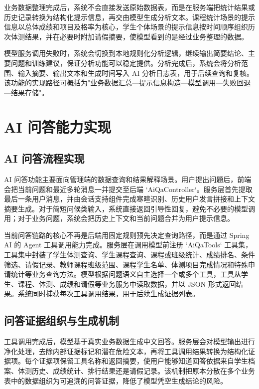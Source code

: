 业务数据整理完成后，系统不会直接发送原始数据表，而是在服务端把统计结果或历史记录转换为结构化提示信息，再交由模型生成分析文本。课程统计场景的提示信息以总体成绩和项目及格率为核心，学生个体场景的提示信息按时间顺序组织历次体测结果，并在必要时附加请假摘要，使模型看到的是经过业务整理的数据。

模型服务调用失败时，系统会切换到本地规则化分析逻辑，继续输出简要结论、主要问题和训练建议，保证分析功能可以稳定提供。分析完成后，系统会将分析范围、输入摘要、输出文本和生成时间写入 AI 分析日志表，用于后续查询和复核。该功能的实现路径可概括为"业务数据汇总—提示信息构造—模型调用—失败回退—结果存储"。

\section{AI 问答能力实现}

\subsection{AI 问答流程实现}

AI 问答功能主要面向管理端的数据查询和结果解释场景。用户提出问题后，前端会把当前问题和最近多轮消息一并提交至后端 `AiQaController`。服务层首先提取最后一条用户消息，并由会话支持组件完成寒暄识别、历史用户发言拼接和上下文摘要生成。对于简短问候类输入，系统直接返回引导性回复，避免不必要的模型调用；对于业务问题，系统会把历史上下文和当前问题合并为用户提示信息。

当前问答链路的核心不再是后端用固定规则预先决定查询路径，而是通过 Spring AI 的 Agent 工具调用能力完成。服务层在调用模型前注册 `AiQaTools` 工具集，工具集中封装了学生体测查询、学生课程查询、课程或班级统计、成绩排名、条件筛选、请假记录、教师课程班级范围、课程学生名单、体测项目完成情况和特殊申请统计等业务查询方法。模型根据问题语义自主选择一个或多个工具，工具从学生、课程、体测、成绩和请假等业务服务中读取数据，并以 JSON 形式返回结果。系统同时捕获每次工具调用结果，用于后续生成证据列表。

\subsection{问答证据组织与生成机制}

工具调用完成后，模型基于真实业务数据生成中文回答。服务层会对模型输出进行净化处理，去除内部证据标记和潜在危险文本，再将工具调用结果转换为结构化证据项。每个证据项保留工具名称和返回摘要，使用户能够知道回答依据来自学生档案、体测历史、成绩统计、排行结果还是请假记录。该机制把原本分散在多个业务表中的数据组织为可追溯的问答证据，降低了模型凭空生成结论的风险。

